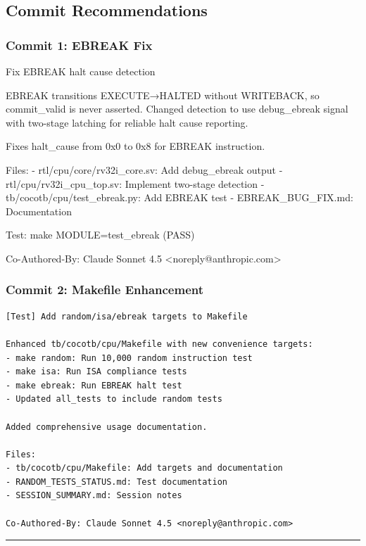 \subsection{Commit Recommendations}\label{cr:app:archive-session-summary:commit-recommendations}

\subsubsection{Commit 1: EBREAK Fix}\label{cr:app:archive-session-summary:commit-1-ebreak-fix}

\begin{record}

\begin{textblock}
[RTL] Fix EBREAK halt cause detection

EBREAK transitions EXECUTE→HALTED without WRITEBACK, so commit_valid
is never asserted. Changed detection to use debug_ebreak signal with
two-stage latching for reliable halt cause reporting.

Fixes halt_cause from 0x0 to 0x8 for EBREAK instruction.

Files:
- rtl/cpu/core/rv32i_core.sv: Add debug_ebreak output
- rtl/cpu/rv32i_cpu_top.sv: Implement two-stage detection
- tb/cocotb/cpu/test_ebreak.py: Add EBREAK test
- EBREAK_BUG_FIX.md: Documentation

Test: make MODULE=test_ebreak (PASS)

Co-Authored-By: Claude Sonnet 4.5 <noreply@anthropic.com>
\end{textblock}

\end{record}

\subsubsection{Commit 2: Makefile Enhancement}\label{cr:app:archive-session-summary:commit-2-makefile-enhancement}

\begin{record}

\begin{lstlisting}[language={}]
[Test] Add random/isa/ebreak targets to Makefile

Enhanced tb/cocotb/cpu/Makefile with new convenience targets:
- make random: Run 10,000 random instruction test
- make isa: Run ISA compliance tests
- make ebreak: Run EBREAK halt test
- Updated all_tests to include random tests

Added comprehensive usage documentation.

Files:
- tb/cocotb/cpu/Makefile: Add targets and documentation
- RANDOM_TESTS_STATUS.md: Test documentation
- SESSION_SUMMARY.md: Session notes

Co-Authored-By: Claude Sonnet 4.5 <noreply@anthropic.com>
\end{lstlisting}

\begin{center}\rule{0.5\linewidth}{0.5pt}\end{center}

\end{record}

